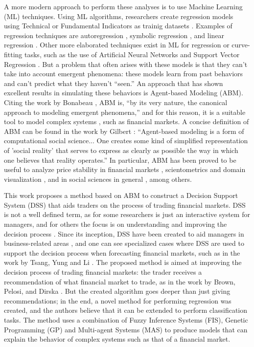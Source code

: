 \documentclass[12pt,journal,draftcls,onecolumn]{IEEEtran}
\begin{document}
A more modern approach to perform these analyses is to use Machine
Learning (ML) techniques. Using ML algorithms,
researchers create regression models using Technical or Fundamental
Indicators as trainig datasets \cite{Connor2005}.
Examples of regression techniques are
autoregression \cite{burg1968new}, symbolic regression
\cite{billard2002symbolic}, and linear regression
\cite{kutner2004applied}. Other more elaborated techniques exist in ML
for regression or curve-fitting tasks, such as the use of Artificial
Neural Networks \cite{melin2007hybrid} and Support Vector Regression
\cite{basak2007support}. But a problem that often arises with these
models is that they can't take into account emergent phenomena: these
models learn from past behaviors and can't predict what they haven't
``seen.'' An approach that has shown excellent results in simulating
these behaviors is Agent-based Modeling (ABM). Citing the work by
Bonabeau \cite{bonabeau2002agent}, ABM is, ``by its very nature, the
canonical approach to modeling emergent phenomena,'' and for this
reason, it is a suitable tool to model complex systems
\cite{jennings2001agent}, such as financial markets. A concise
definition of ABM can be found in the work by Gilbert
\cite{gilbert2008agent}: ``Agent-based modeling is a form of
computational social science... One creates some kind of simplified
representation of 'social reality' that serves to express as clearly
as possible the way in which one believes that reality operates.'' In
particular, ABM has been proved to be useful to analyze price
stability in financial markets \cite{Pellizzari2007}, scientometrics
and domain visualization \cite{Niazi2011}, and in social sciences in
general \cite{gilbert2008agent}, among others.

This work proposes a method based on ABM to construct a Decision
Support System (DSS) that aids traders on the process of trading
financial markets. DSS is not a well defined term, as for some
researchers is just an interactive system for managers, and for others
the focus is on understanding and improving the decision process
\cite{keen1980decision}. Since its inception, DSS have been created to
aid managers in business-related areas \cite{Sprague1980}
\cite{little1979decision}, and one can see specialized cases where DSS
are used to support the decision process when forecasting financial
markets, such as in the work by Tsang, Yung and Li
\cite{Tsang2004}. The proposed method is aimed at improving the
decision process of trading financial markets: the trader receives a
recommendation of what financial market to trade, as in the work by
Brown, Pelosi, and Dirska \cite{brown2013dynamic}. But the created
algorithm goes deeper than just giving recommendations; in the end, a
novel method for performing regression was created, and the authors
believe that it can be extended to perform classification tasks. The
method uses a combination of Fuzzy Inference Systems (FIS), Genetic
Programming (GP) \cite{poli2008field} \cite{Koza1992} and Multi-agent
Systems (MAS) \cite{Shoham2009} to produce models that can explain the
behavior of complex systems such as that of a financial market.
\end{document}
